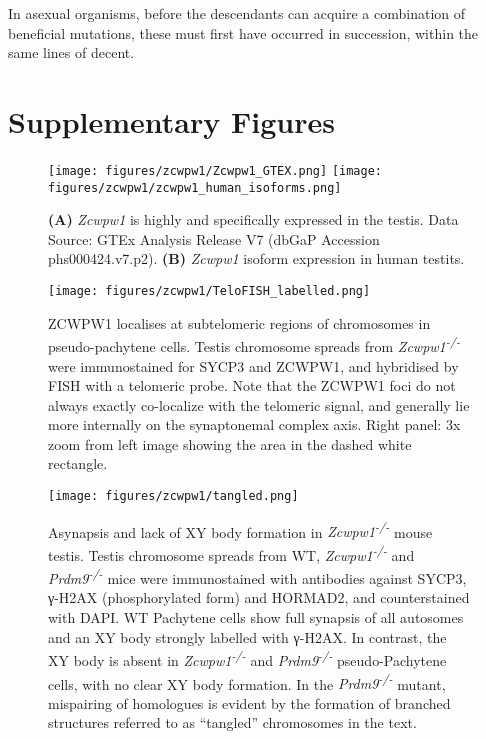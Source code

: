 \begin{savequote}[8cm]
In asexual organisms, before the descendants can acquire a combination of beneficial mutations, these must first have occurred in succession, within the same lines of decent.
\end{savequote}

\chapter{\label{app:1-A}Supplementary Figures}

\minitoc



\begin{figure}[H]
	\centering
	\texttt{[image: figures/zcwpw1/Zcwpw1\_GTEX.png]}
	\texttt{[image: figures/zcwpw1/zcwpw1\_human\_isoforms.png]}
	\caption[\textit{Zcwpw1} Tissue and Isoform expression]{
		\textbf{(A)} \textit{Zcwpw1} is highly and specifically expressed in the testis.
			Data Source: GTEx Analysis Release V7 (dbGaP Accession phs000424.v7.p2).
		\textbf{(B)} \textit{Zcwpw1} isoform expression in human testits.
	}
	\label{fig:isoforms}
\end{figure}


\begin{figure}[H]
	\centering
	\texttt{[image: figures/zcwpw1/TeloFISH\_labelled.png]}
	\caption[Telomeric Localisation]{
		ZCWPW1 localises at subtelomeric regions of chromosomes in pseudo-pachytene cells.
		Testis chromosome spreads from \textit{Zcwpw1\textsuperscript{-/-}} were immunostained for SYCP3 and ZCWPW1, and hybridised by FISH with a telomeric probe.
		Note that the ZCWPW1 foci do not always exactly co-localize with the telomeric signal, and generally lie more internally on the synaptonemal complex axis.
		Right panel: 3x zoom from left image showing the area in the dashed white rectangle.
	}
	\label{fig:telofish}
\end{figure}


\begin{figure}[H]
	\centering
	\texttt{[image: figures/zcwpw1/tangled.png]}
	\caption[Tangled Chromosome Phenotype]{
		Asynapsis and lack of XY body formation in \textit{Zcwpw1\textsuperscript{-/-}} mouse testis.
		Testis chromosome spreads from WT, \textit{Zcwpw1\textsuperscript{-/-}} and \textit{Prdm9\textsuperscript{-/-}} mice were immunostained with antibodies against SYCP3, γ-H2AX (phosphorylated form) and HORMAD2, and counterstained with DAPI.
		WT Pachytene cells show full synapsis of all autosomes and an XY body strongly labelled with γ-H2AX.
		In contrast, the XY body is absent in \textit{Zcwpw1\textsuperscript{-/-}} and \textit{Prdm9\textsuperscript{-/-}} pseudo-Pachytene cells, with no clear XY body formation.
		In the \textit{Prdm9\textsuperscript{-/-}} mutant, mispairing of homologues is evident by the formation of branched structures referred to as “tangled” chromosomes in the text.
	}
	\label{fig:tangled}
\end{figure}


